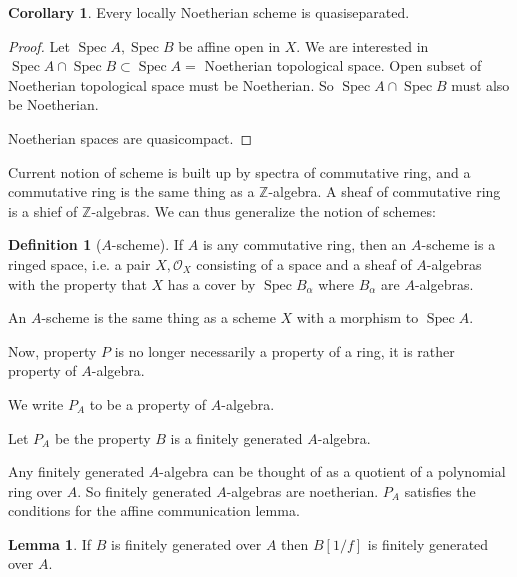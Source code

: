 \documentclass{article}
\theoremstyle{definition}
\newtheorem*{definition}{Definition}
\newtheorem{lemma}[theorem]{Lemma}
\newtheorem{corollary}[theorem]{Corollary}
\begin{document}
    \begin{corollary}
        Every locally Noetherian scheme is quasiseparated.
    \end{corollary}

    \begin{proof}
        Let \(\operatorname{Spec} A, \operatorname{Spec} B\) be affine open in \(X\). We are interested in \(\operatorname{Spec} A \cap \operatorname{Spec} B \subset \operatorname{Spec} A =\) Noetherian topological space. Open subset of Noetherian topological space must be Noetherian. So \(\operatorname{Spec} A \cap \operatorname{Spec} B\) must also be Noetherian.

        Noetherian spaces are quasicompact. 
    \end{proof}

    Current notion of scheme is built up by spectra of commutative ring, and a commutative ring is the same thing as a \(\mathbb{Z}\)-algebra. A sheaf of commutative ring is a shief of \(\mathbb{Z}\)-algebras. We can thus generalize the notion of schemes:

    \begin{definition}
        [\(A\)-scheme] If \(A\) is any commutative ring, then an \(A\)-scheme is a ringed space, i.e. a pair \(X, \mathcal{O}_X\) consisting of a space  and a sheaf of \(A\)-algebras with the property that \(X\) has a cover by \(\operatorname{Spec} B_\alpha\) where \(B_\alpha\) are \(A\)-algebras.
    \end{definition}

    An \(A\)-scheme is the same thing as a scheme \(X\) with a morphism to \(\operatorname{Spec} A\).

    Now, property \(P\) is no longer necessarily a property of a ring, it is rather property of \(A\)-algebra.

    We write \(P_A\) to be a property of \(A\)-algebra.
    
    Let \(P_A\) be the property \(B\) is a finitely generated \(A\)-algebra.

    Any finitely generated \(A\)-algebra can be thought of as a quotient of a polynomial ring over \(A\). So finitely generated \(A\)-algebras are noetherian. \(P_A\) satisfies the conditions for the affine communication lemma.

    \begin{lemma}
        If \(B\) is finitely generated over \(A\) then \(B[1 / f]\) is finitely generated over \(A\).
    \end{lemma}
\end{document}
